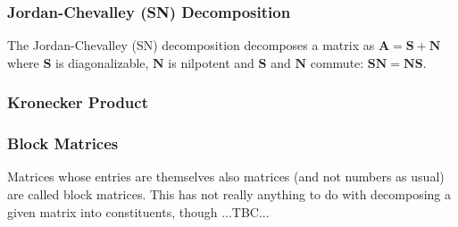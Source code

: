 


\subsubsection{Jordan-Chevalley (SN) Decomposition}
The Jordan-Chevalley (SN) decomposition decomposes a matrix as $\mathbf{A} =  \mathbf{S + N}$ where $\mathbf{S}$ is diagonalizable, $\mathbf{N}$ is nilpotent and $\mathbf{S}$ and $\mathbf{N}$ commute:
$\mathbf{SN} = \mathbf{NS}$.



\subsubsection{Kronecker Product}


\subsubsection{Block Matrices}
Matrices whose entries are themselves also matrices (and not numbers as usual) are called block matrices. This has not really anything to do with decomposing a given matrix into constituents, though ...TBC...




\begin{comment}
	
Dear linear algebra students, This is what matrices (and matrix manipulation) really look like	
https://www.youtube.com/watch?v=4csuTO7UTMo	

Interpretation of matrices:

-in the context of solving linear systems of equations
 -each row gives a left-hand-side of one equation the system
 -each row defines a hyperplane, the solution of the system is the point where all
  hyperplanes intersect
 -each column represents a vector and we are looking for the coeffs to scale the 
  cols by to obtain agiven target vector on the RHS

-In the context of linear transformations:
 -the j-th column tells us where the j-th unit basis vector is mapped to
 
Maybe have sections for
-Product Decompositions

	
\end{comment}